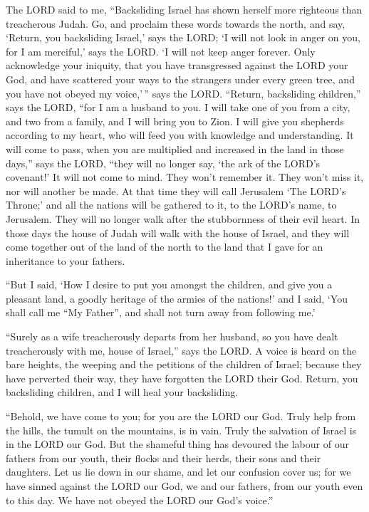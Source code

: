  The LORD said to me, ``Backsliding Israel has shown
herself more righteous than treacherous Judah.  Go, and
proclaim these words towards the north, and say, `Return, you
backsliding Israel,' says the LORD; `I will not look in anger on you,
for I am merciful,' says the LORD. `I will not keep anger forever.
 Only acknowledge your iniquity, that you have transgressed
against the LORD your God, and have scattered your ways to the strangers
under every green tree, and you have not obeyed my voice,'\,'' says the
LORD.  ``Return, backsliding children,'' says the LORD,
``for I am a husband to you. I will take one of you from a city, and two
from a family, and I will bring you to Zion.  I will give
you shepherds according to my heart, who will feed you with knowledge
and understanding.  It will come to pass, when you are
multiplied and increased in the land in those days,'' says the LORD,
``they will no longer say, `the ark of the LORD's covenant!' It will not
come to mind. They won't remember it. They won't miss it, nor will
another be made.  At that time they will call Jerusalem
`The LORD's Throne;' and all the nations will be gathered to it, to the
LORD's name, to Jerusalem. They will no longer walk after the
stubbornness of their evil heart.  In those days the house
of Judah will walk with the house of Israel, and they will come together
out of the land of the north to the land that I gave for an inheritance
to your fathers.

 ``But I said, `How I desire to put you amongst the
children, and give you a pleasant land, a goodly heritage of the armies
of the nations!' and I said, `You shall call me ``My Father'', and shall
not turn away from following me.'

 ``Surely as a wife treacherously departs from her husband,
so you have dealt treacherously with me, house of Israel,'' says the
LORD.  A voice is heard on the bare heights, the weeping
and the petitions of the children of Israel; because they have perverted
their way, they have forgotten the LORD their God.  Return,
you backsliding children, and I will heal your backsliding.

``Behold, we have come to you; for you are the LORD our God.
 Truly help from the hills, the tumult on the mountains, is
in vain. Truly the salvation of Israel is in the LORD our God.
 But the shameful thing has devoured the labour of our
fathers from our youth, their flocks and their herds, their sons and
their daughters.  Let us lie down in our shame, and let our
confusion cover us; for we have sinned against the LORD our God, we and
our fathers, from our youth even to this day. We have not obeyed the
LORD our God's voice.''


